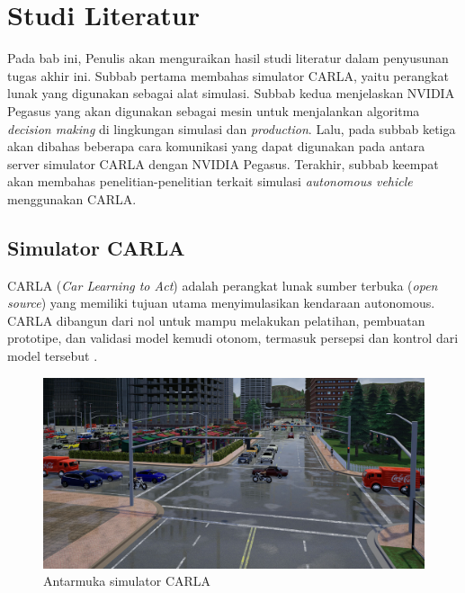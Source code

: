 \chapter{Studi Literatur}

Pada bab ini, Penulis akan menguraikan hasil studi literatur dalam penyusunan
tugas akhir ini. Subbab pertama membahas simulator CARLA, yaitu perangkat lunak
yang digunakan sebagai alat simulasi. Subbab kedua menjelaskan NVIDIA Pegasus
yang akan digunakan sebagai mesin untuk menjalankan algoritma \textit{decision
	making} di lingkungan simulasi dan \textit{production}. Lalu, pada subbab ketiga
akan dibahas beberapa cara komunikasi yang dapat digunakan pada antara server
simulator CARLA dengan NVIDIA Pegasus. Terakhir, subbab keempat akan membahas
penelitian-penelitian terkait simulasi \textit{autonomous vehicle} menggunakan
CARLA.

\section{Simulator CARLA}

CARLA (\textit{Car Learning to Act}) adalah perangkat lunak sumber terbuka
(\textit{o\-pen sour\-ce}) yang memiliki tujuan utama menyimulasikan kendaraan
autonomous. CAR\-LA dibangun dari nol untuk mampu melakukan pelatihan, pembuatan
prototipe, dan validasi model kemudi otonom, termasuk persepsi dan kontrol dari
model tersebut \parencite{dos_carla}.

\begin{center}
	\begin{figure}
		\includegraphics[width=1.0\textwidth]{resources/chapter-2/CARLA.jpg}
		\caption{Antarmuka simulator CARLA \parencite{loze_carlaDemocratizes}}
	\end{figure}
\end{center}


